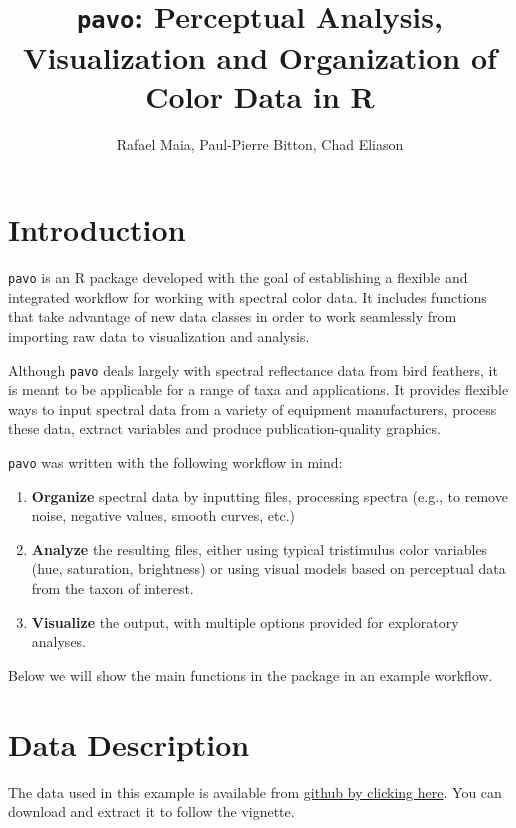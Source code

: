 \documentclass{article}
\newcommand{\pavo}{{\tt pavo}}  %
\begin{document}



\title{\pavo{}: {\bf P}erceptual {\bf A}nalysis, {\bf V}isualization and {\bf O}rganization of Color Data in R}
\author{Rafael Maia, Paul-Pierre Bitton, Chad Eliason}

\maketitle

\section*{Introduction}

\pavo{} is an R package developed with the goal of establishing a flexible and integrated 
workflow for working with spectral color data. It includes functions that take advantage of
new data classes in order to work seamlessly from importing raw data to visualization and 
analysis.

Although \pavo{} deals largely with spectral reflectance data from bird feathers, it is meant 
to be applicable for a range of taxa and applications. It provides flexible ways to input
spectral data from a variety of equipment manufacturers, process these data, extract variables 
and produce publication-quality graphics.

\pavo{} was written with the following workflow in mind:

\begin{enumerate}
\item {\bf Organize} spectral data by inputting files, processing spectra (e.g., to remove
noise, negative values, smooth curves, etc.)
\item {\bf Analyze} the resulting files, either using typical tristimulus color variables (hue,
saturation, brightness) or using visual models based on perceptual data from the taxon of 
interest.
\item {\bf Visualize} the output, with multiple options provided for exploratory analyses.
\end{enumerate}

Below we will show the main functions in the package in an example workflow. 

\section{Data Description}

The data used in this example is available from 
\href{https://github.com/rmaia/pavo/blob/master/vignette_data/vignette_data.zip}
{github by clicking here}. 
You can download and extract it to follow the vignette.
\end{document}

